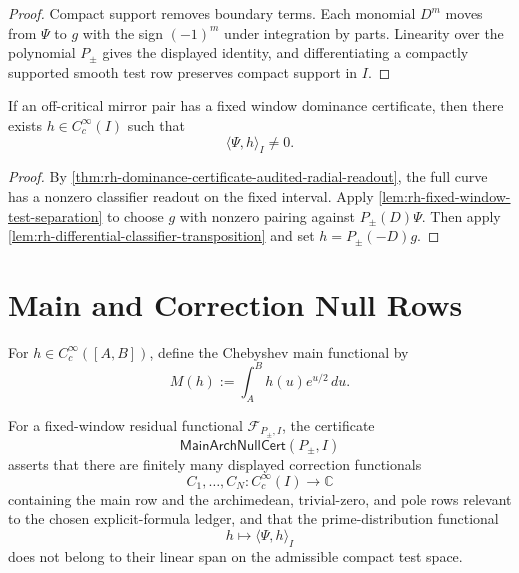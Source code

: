 \begin{proof}
Compact support removes boundary terms.  Each monomial $D^m$ moves
from $\Psi$ to $g$ with the sign $(-1)^m$ under integration by parts.
Linearity over the polynomial $P_\pm$ gives the displayed identity, and
differentiating a compactly supported smooth test row preserves compact
support in $I$.
\end{proof}

\begin{theorem}
\label{thm:rh-dominance-supplies-compact-nonzero-test}
If an off-critical mirror pair has a fixed window dominance certificate,
then there exists $h\in C_c^\infty(I)$ such that
$$
\langle\Psi,h\rangle_I\ne0.
$$
\end{theorem}

\begin{proof}
By
\autoref{thm:rh-dominance-certificate-audited-radial-readout}, the full
curve has a nonzero classifier readout on the fixed interval.  Apply
\autoref{lem:rh-fixed-window-test-separation} to choose $g$ with
nonzero pairing against $P_\pm(D)\Psi$.  Then apply
\autoref{lem:rh-differential-classifier-transposition} and set
$h=P_\pm(-D)g$.
\end{proof}

\section{Main and Correction Null Rows}
\label{sec:rh-prime-projection-main-correction-null-rows}

\begin{definition}
\label{def:rh-chebyshev-main-functional}
For $h\in C_c^\infty([A,B])$, define the Chebyshev main functional by
$$
M(h):=\int_A^B h(u)e^{u/2}\,du.
$$
\end{definition}

\begin{definition}[MainArchNullCert]
\label{def:rh-main-arch-null-cert}
For a fixed-window residual functional $\mathcal F_{P_\pm,I}$, the
certificate
$$
\mathsf{MainArchNullCert}(P_\pm,I)
$$
asserts that there are finitely many displayed correction functionals
$$
C_1,\ldots,C_N:C_c^\infty(I)\to\mathbb C
$$
containing the main row and the archimedean, trivial-zero, and pole
rows relevant to the chosen explicit-formula ledger, and that the
prime-distribution functional
$$
h\longmapsto\langle\Psi,h\rangle_I
$$
does not belong to their linear span on the admissible compact test
space.
\end{definition}

